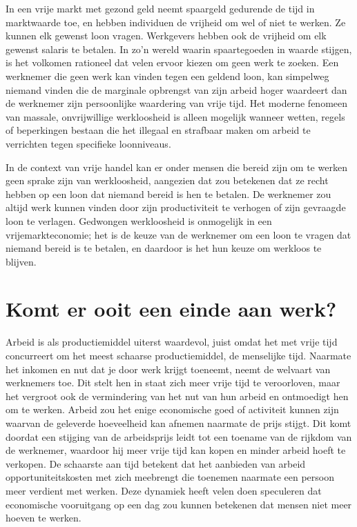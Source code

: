In een vrije markt met gezond geld neemt spaargeld gedurende de tijd in
marktwaarde toe, en hebben individuen de vrijheid om wel of niet te
werken. Ze kunnen elk gewenst loon vragen. Werkgevers hebben ook de
vrijheid om elk gewenst salaris te betalen. In zo'n
wereld waarin spaartegoeden in waarde stijgen, is het volkomen rationeel
dat velen ervoor kiezen om geen werk te zoeken. Een werknemer die geen
werk kan vinden tegen een geldend loon, kan simpelweg niemand vinden die
de marginale opbrengst van zijn arbeid hoger waardeert dan de werknemer
zijn persoonlijke waardering van vrije tijd. Het moderne fenomeen van
massale, onvrijwillige werkloosheid is alleen mogelijk wanneer wetten,
regels of beperkingen bestaan die het illegaal en strafbaar maken om
arbeid te verrichten tegen specifieke loonniveaus.

In de context van vrije handel kan er onder mensen die bereid zijn om te
werken geen sprake zijn van werkloosheid, aangezien dat zou betekenen
dat ze recht hebben op een loon dat niemand bereid is hen te betalen. De
werknemer zou altijd werk kunnen vinden door zijn productiviteit te
verhogen of zijn gevraagde loon te verlagen. Gedwongen werkloosheid is
onmogelijk in een vrijemarkteconomie; het is de keuze van de werknemer
om een loon te vragen dat niemand bereid is te betalen, en daardoor is
het hun keuze om werkloos te blijven.

\section{Komt er ooit een einde aan werk?}

Arbeid is als productiemiddel uiterst waardevol, juist omdat het met
vrije tijd concurreert om het meest schaarse productiemiddel, de
menselijke tijd. Naarmate het inkomen en nut dat je door werk krijgt toeneemt, neemt de welvaart van werknemers toe. Dit stelt hen in staat
zich meer vrije tijd te veroorloven, maar het vergroot ook de
vermindering van het nut van hun arbeid en ontmoedigt hen om te werken.
Arbeid zou het enige economische goed of activiteit kunnen zijn waarvan
de geleverde hoeveelheid kan afnemen naarmate de prijs stijgt. Dit komt
doordat een stijging van de arbeidsprijs leidt tot een toename van de
rijkdom van de werknemer, waardoor hij meer vrije tijd kan kopen en
minder arbeid hoeft te verkopen. De schaarste aan tijd betekent dat het
aanbieden van arbeid opportuniteitskosten met zich meebrengt die
toenemen naarmate een persoon meer verdient met werken. Deze dynamiek
heeft velen doen speculeren dat economische vooruitgang op een dag zou
kunnen betekenen dat mensen niet meer hoeven te werken.

